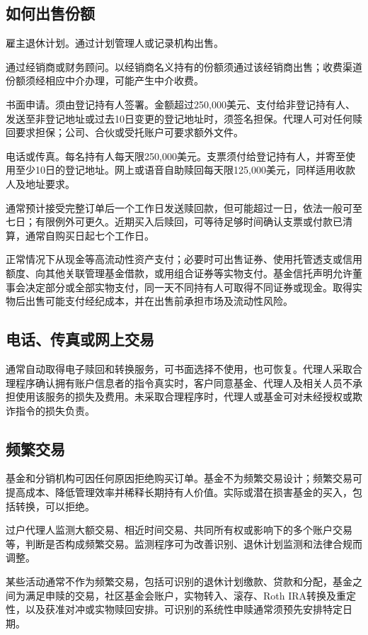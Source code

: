 \documentclass[UTF8,fontset=none,11pt,a4paper]{ctexart}
\begin{document}
\subsection*{如何出售份额}
雇主退休计划。通过计划管理人或记录机构出售。


通过经销商或财务顾问。以经销商名义持有的份额须通过该经销商出售；收费渠道份额须经相应中介办理，可能产生中介收费。


书面申请。须由登记持有人签署。金额超过250,000美元、支付给非登记持有人、发送至非登记地址或过去10日变更的登记地址时，须签名担保。代理人可对任何赎回要求担保；公司、合伙或受托账户可要求额外文件。


电话或传真。每名持有人每天限250,000美元。支票须付给登记持有人，并寄至使用至少10日的登记地址。网上或语音自助赎回每天限125,000美元，同样适用收款人及地址要求。


通常预计接受完整订单后一个工作日发送赎回款，但可能超过一日，依法一般可至七日；有限例外可更久。近期买入后赎回，可等待足够时间确认支票或付款已清算，通常自购买日起七个工作日。


正常情况下从现金等高流动性资产支付；必要时可出售证券、使用托管透支或信用额度、向其他关联管理基金借款，或用组合证券等实物支付。基金信托声明允许董事会决定部分或全部实物支付，同一天不同持有人可取得不同证券或现金。取得实物后出售可能支付经纪成本，并在出售前承担市场及流动性风险。


\subsection*{电话、传真或网上交易}
通常自动取得电子赎回和转换服务，可书面选择不使用，也可恢复。代理人采取合理程序确认拥有账户信息者的指令真实时，客户同意基金、代理人及相关人员不承担使用该服务的损失及费用。未采取合理程序时，代理人或基金可对未经授权或欺诈指令的损失负责。


\subsection*{频繁交易}
基金和分销机构可因任何原因拒绝购买订单。基金不为频繁交易设计；频繁交易可提高成本、降低管理效率并稀释长期持有人价值。实际或潜在损害基金的买入，包括转换，可以拒绝。


过户代理人监测大额交易、相近时间交易、共同所有权或影响下的多个账户交易等，判断是否构成频繁交易。监测程序可为改善识别、退休计划监测和法律合规而调整。


某些活动通常不作为频繁交易，包括可识别的退休计划缴款、贷款和分配，基金之间为满足申赎的交易，社区基金会账户，实物转入、滚存、Roth IRA转换及重定性，以及获准对冲或实物赎回安排。可识别的系统性申赎通常须预先安排特定日期。
\end{document}
